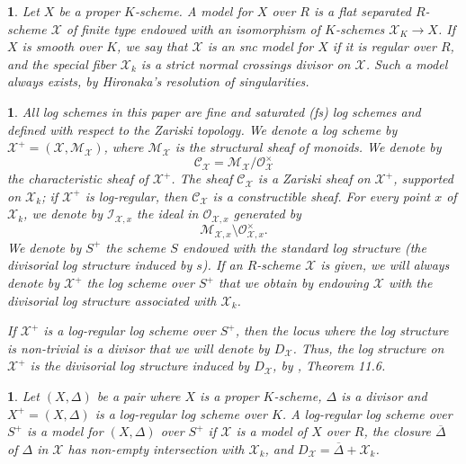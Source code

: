 \documentclass{amsart}%
\numberwithin{equation}{subsection}
\theoremstyle{plain2}
\theoremstyle{definition2}
\theoremstyle{stepstyle}
\theoremstyle{point}
\theoremstyle{subpoint}
\newtheorem{subpoint}[equation]{}%
\newcommand{\spa}[1]{\begin{subpoint}#1\end{subpoint}}           %
\newcommand{\cX}{\ensuremath{\mathscr{X}}}
\newcommand{\caM}{\ensuremath{\mathcal{M}}}
\newcommand{\caC}{\ensuremath{\mathcal{C}}}
\begin{document}
\spa{Let $X$ be a proper $K$-scheme. A model for $X$ over $R$ is a flat separated $R$-scheme $\cX$ of finite type endowed with an isomorphism of $K$-schemes $\cX_K \rightarrow X$. If $X$ is smooth over $K$,
we say that $\cX$ is an snc model for $X$ if it is regular over $R$, and the
special fiber $\cX_k$ is a strict normal crossings divisor on $\cX$. Such a model always exists, by Hironaka's resolution of singularities.}

\spa{ \label{sss-log} All log schemes in this paper are  fine and saturated (\emph{fs}) log schemes and defined with respect to the Zariski topology. We denote a log scheme by $\cX^+=(\cX,\caM_{\cX})$, where $\caM_{\cX}$ is the structural sheaf of monoids. We denote by $$\mathcal{C}_{\cX}=\mathcal{M}_{\cX}/\mathcal{O}_{\cX}^{\times}$$
the characteristic sheaf of $\cX^+$. The sheaf $\mathcal{C}_{\cX}$
is a Zariski sheaf on $\cX^+$, supported on $\cX_k$; if $\cX^+$ is log-regular, then $\caC_{\cX}$ is a constructible sheaf.
For every point $x$ of $\cX_k$, we denote by $\mathcal{I}_{\cX,x}$
the ideal in $\mathcal{O}_{\cX,x}$ generated by
$$\mathcal{M}_{\cX,x}\setminus \mathcal{O}_{\cX,x}^{\times}.$$ We denote
by $S^+$ the scheme $S$ endowed with the standard log structure
(the divisorial log structure induced by $s$). If an $R$-scheme $\cX$ is given, we will always denote by $\cX^+$ the log scheme over $S^+$ that we obtain by endowing $\cX$ with the divisorial log structure associated with
$\cX_k$.

If $\cX^+$ is a log-regular log scheme over $S^+$, then the locus where the log structure is non-trivial is a divisor that we will denote by $D_{\cX}$. Thus, the log structure on $\cX^+$ is the divisorial log structure induced by $D_{\cX}$, by \cite{Kato1994a}, Theorem 11.6.

}

\spa{Let $(X,\Delta)$ be a pair where $X$ is a proper $K$-scheme, $\Delta$ is a divisor and $X^+=(X,\Delta)$ is a log-regular log scheme over $K$. A log-regular log scheme over $S^+$ is a model for $(X,\Delta)$ over $S^+$ if $\cX$ is a model of $X$ over $R$, the closure $\overline{\Delta}$ of $\Delta$ in $\cX$ has non-empty intersection with $\cX_k$, and $D_\cX = \overline{\Delta} + \cX_k$. }
\end{document}
